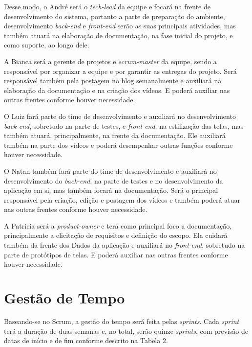 \documentclass[
    12pt,               %
    openright,          %
    oneside,
    a4paper,            %
    paginasA3,  %
    english,            %
    brazil              %
    ]{ifsp-spo-inf-ctds} %
\begin{document}
Desse modo, o André será o \textit{\gls{tech-lead}} da equipe e focará na frente de desenvolvimento do sistema, portanto a parte de preparação do ambiente, desenvolvimento \textit{\gls{back-end}} e \textit{\gls{front-end}} serão as suas principais atividades, mas também atuará na elaboração de documentação, na fase inicial do projeto, e como suporte, ao longo dele.


A Bianca será a gerente de projetos e \textit{\gls{scrum-master}} da equipe, sendo a responsável por organizar a equipe e por garantir as entregas do projeto. Será responsável também pela postagem no blog semanalmente e auxiliará na elaboração da documentação e na criação dos vídeos. E poderá auxiliar nas outras frentes conforme houver necessidade.


O Luiz fará parte do time de desenvolvimento e auxiliará no desenvolvimento \textit{\gls{back-end}}, sobretudo na parte de testes, e \textit{\gls{front-end}}, na estilização das telas, mas também atuará, principalmente, na frente da documentação. Ele auxiliará também na parte dos vídeos e poderá desempenhar outras funções conforme houver necessidade.


O Natan também fará parte do time de desenvolvimento e auxiliará no desenvolvimento do \textit{\gls{back-end}}, na parte de testes e no desenvolvimento da aplicação em si, mas também focará na documentação. Será o principal responsável pela criação, edição e postagem dos vídeos e também poderá atuar nas outras frentes conforme houver necessidade.


A Patrícia será a \textit{\gls{product-owner}} e terá como principal foco a documentação, principalmente a elicitação de requisitos e definição do escopo. Ela cuidará também da frente dos Dados da aplicação e auxiliará no \textit{\gls{front-end}}, sobretudo na parte de protótipos de telas. E poderá auxiliar nas outras frentes conforme houver necessidade.


\section{Gestão de Tempo}

Baseando-se no Scrum, a gestão do tempo será feita pelas \textit{\glspl{sprint}}. Cada \textit{\gls{sprint}} terá a duração de duas semanas e, no total, serão quinze \textit{\glspl{sprint}}, com previsão de datas de início e de fim conforme descrito na Tabela 2. 
\end{document}

